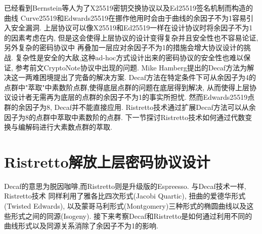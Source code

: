 \documentclass{article}
\begin{document}
已经看到Bernstein等人为了X25519密钥交换协议以及Ed25519签名机制而构造的曲线
Curve25519和Edwards25519在挪作他用时会由于曲线的余因子不为1容易引入安全漏洞.
上层协议可以像X25519和Ed25519一样在设计协议时将余因子不为1的因素考虑在内,
但是这会使得上层协议的设计变得复杂并且安全性也不容易论证,另外复杂的密码协议中
再叠加一层应对余因子不为1的措施会增大协议设计的挑战.
复杂性是安全的大敌,这种ad-hoc方式设计出来的密码协议的安全性也难以保证,
参考前文CryptoNote协议中出现的问题.
Mike Hamberg提出的Decaf方法为解决这一两难困境提出了完备的解决方案.
Decaf方法在特定条件下可从余因子为4的点群中"萃取"中素数阶点群,使得底层点群的问题在底层得到解决,
从而使得上层协议设计者无需再为底层的点群的余因子不为1的事实所担忧.
然而Edwards25519点群的余因子为8, Decaf并不能直接应用.
Ristretto技术通过扩展Decaf方法可以从余因子为8的点群中萃取中素数阶的点群.
下一节探讨Ristretto技术如何通过代数变换与编解码进行大素数点群的萃取.

\section{Ristretto解放上层密码协议设计}

Decaf的意思为脱因咖啡,而Ristretto则是升级版的Espreesso. 与Decaf技术一样, Ristretto技术
同样利用了雅各比四次形式(Jacobi Quartic), 扭曲的爱德华形式(Twisted Edwards),
以及蒙哥马利形式(Montgomery)三种形式的椭圆曲线以及这些形式之间的同源(Isogeny).
接下来考察Decaf和Ristretto是如何通过利用不同的曲线形式以及同源关系消除了余因子不为1的影响.
\end{document}
